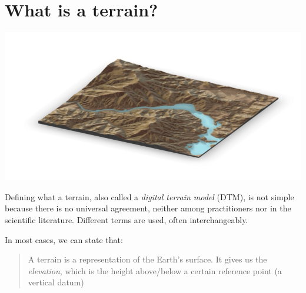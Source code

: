 
\graphicspath{{whatisterrain/}}



\chapter{What is a terrain?}%
\label{chap:whatisterrain}


\begin{center}
  \includegraphics[width=\linewidth]{figs/header.jpg}
\end{center}

Defining what a terrain, also called a \emph{digital terrain model} (DTM), is not simple because there is no universal agreement, neither among practitioners nor in the scientific literature.
Different terms are used, often interchangeably.

In most cases, we can state that:

\begin{quote}
A terrain is a representation of the Earth's surface. 
It gives us the \emph{elevation}, which is the height above/below a certain reference point (a vertical datum)
\end{quote}


